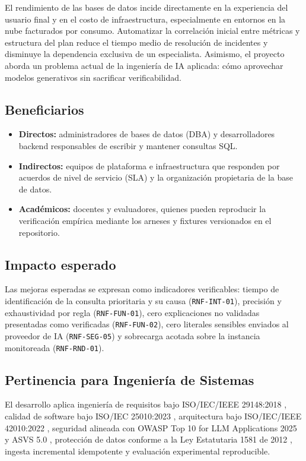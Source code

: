 \documentclass[12pt,a4paper]{article}
\begin{document}
El rendimiento de las bases de datos incide directamente en la experiencia del usuario final y en el costo de infraestructura, especialmente en entornos en la nube facturados por consumo. Automatizar la correlación inicial entre métricas y estructura del plan reduce el tiempo medio de resolución de incidentes y disminuye la dependencia exclusiva de un especialista. Asimismo, el proyecto aborda un problema actual de la ingeniería de IA aplicada: cómo aprovechar modelos generativos sin sacrificar verificabilidad.

\subsection{Beneficiarios}

\begin{itemize}[leftmargin=1.5em]
    \item \textbf{Directos:} administradores de bases de datos (DBA) y desarrolladores backend responsables de escribir y mantener consultas SQL.
    \item \textbf{Indirectos:} equipos de plataforma e infraestructura que responden por acuerdos de nivel de servicio (SLA) y la organización propietaria de la base de datos.
    \item \textbf{Académicos:} docentes y evaluadores, quienes pueden reproducir la verificación empírica mediante los arneses y fixtures versionados en el repositorio.
\end{itemize}

\subsection{Impacto esperado}

Las mejoras esperadas se expresan como indicadores verificables: tiempo de identificación de la consulta prioritaria y su causa (\texttt{RNF-INT-01}), precisión y exhaustividad por regla (\texttt{RNF-FUN-01}), cero explicaciones no validadas presentadas como verificadas (\texttt{RNF-FUN-02}), cero literales sensibles enviados al proveedor de IA (\texttt{RNF-SEG-05}) y sobrecarga acotada sobre la instancia monitoreada (\texttt{RNF-RND-01}).

\subsection{Pertinencia para Ingeniería de Sistemas}

El desarrollo aplica ingeniería de requisitos bajo ISO/IEC/IEEE 29148:2018 \cite{iso-29148}, calidad de software bajo ISO/IEC 25010:2023 \cite{iso-25010}, arquitectura bajo ISO/IEC/IEEE 42010:2022 \cite{iso-42010}, seguridad alineada con OWASP Top 10 for LLM Applications 2025 \cite{owasp-llm} y ASVS 5.0 \cite{owasp-asvs}, protección de datos conforme a la Ley Estatutaria 1581 de 2012 \cite{ley-1581}, ingesta incremental idempotente y evaluación experimental reproducible.
\end{document}
